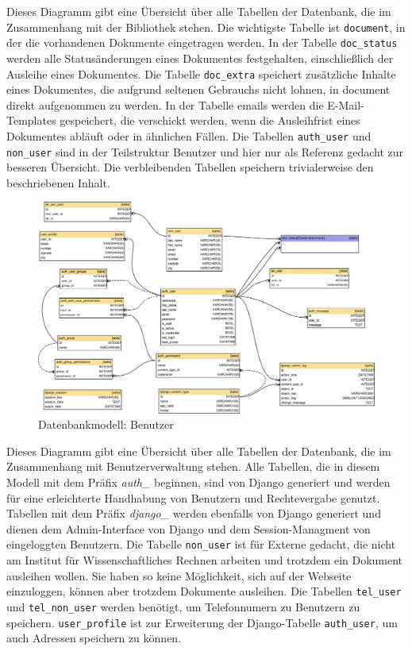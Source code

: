 Dieses Diagramm gibt eine Übersicht über alle Tabellen der Datenbank, die im
Zusammenhang mit der Bibliothek stehen. Die wichtigste Tabelle ist
\lstinline{document}, in der die vorhandenen Dokumente eingetragen werden. In
der Tabelle \lstinline{doc_status} werden alle Statusänderungen eines Dokumentes
festgehalten, einschließlich der Ausleihe eines Dokumentes. Die Tabelle
\lstinline{doc_extra} speichert zusätzliche Inhalte eines Dokumentes, die aufgrund
seltenen Gebrauchs nicht lohnen, in document direkt aufgenommen zu werden. In
der Tabelle emails werden die E-Mail-Templates gespeichert, die verschickt
werden, wenn die Ausleihfrist eines Dokumentes abläuft oder in ähnlichen
Fällen. Die Tabellen \lstinline{auth_user} und \lstinline{non_user} sind in der Teilstruktur Benutzer
und hier nur als Referenz gedacht zur besseren Übersicht. Die verbleibenden
Tabellen speichern trivialerweise den beschriebenen Inhalt.


\begin{figure}[H]
\includegraphics[width=1.0\linewidth]{bilder/database-wirelib_cluster-user.pdf}
\caption{Datenbankmodell: Benutzer}
\label{fig:DB_UserDiagramm}
\end{figure}

Dieses Diagramm gibt eine Übersicht über alle Tabellen der Datenbank, die im
Zusammenhang mit Benutzerverwaltung stehen. Alle Tabellen, die in diesem Modell
mit dem Präfix \emph{auth\_} beginnen, sind von Django generiert und werden für
eine erleichterte Handhabung von Benutzern und Rechtevergabe genutzt. Tabellen
mit dem Präfix \emph{django\_} werden ebenfalls von Django generiert und dienen
dem Admin-Interface von Django und dem Session-Managment von eingeloggten
Benutzern. Die Tabelle \lstinline{non_user} ist für Externe gedacht, die nicht
am Institut für Wissenschaftliches Rechnen arbeiten und trotzdem ein Dokument
ausleihen wollen. Sie haben so keine Möglichkeit, sich auf der Webseite
einzuloggen, können aber trotzdem Dokumente ausleihen. Die Tabellen
\lstinline{tel_user} und \lstinline{tel_non_user} werden benötigt, um
Telefonnumern zu Benutzern zu speichern.  \lstinline{user_profile} ist zur
Erweiterung der Django-Tabelle \lstinline{auth_user}, um auch Adressen
speichern zu können.

